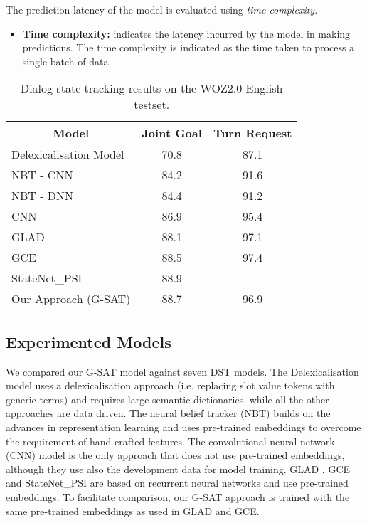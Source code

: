 \documentclass{article}
\begin{document}
The prediction latency of the model is evaluated using \textit{time complexity}.
\begin{itemize}
    \item \textbf{Time complexity:} indicates the latency incurred by the model in making predictions. The time complexity is indicated as the time taken to process a single batch of data.
\end{itemize}

\begin{table}
    \centering
    \begin{tabular}{l|c|c}
        \multicolumn{1}{c|}{\textbf{Model}} & \textbf{Joint Goal} & \textbf{Turn Request}\\
        \hline
        Delexicalisation Model\cite{NBT} & 70.8 & 87.1\\
NBT - CNN\cite{NBT} & 84.2 & 91.6 \\
        NBT - DNN\cite{NBT} & 84.4 & 91.2 \\    
        CNN\cite{Mandy2018} & 86.9 & 95.4\\
        GLAD\cite{GLAD} & 88.1 & 97.1\\
        GCE\cite{GCE} & 88.5 & 97.4\\
        StateNet\_PSI\cite{Ren2018} & 88.9 & - \\
        \hline
        Our Approach (G-SAT) & 88.7 & 96.9 \\
\end{tabular}
    \label{tab:exp_results}
    \caption{Dialog state tracking results on the WOZ2.0 English testset.}
\end{table}

\subsection{Experimented Models}
We compared our G-SAT model against seven DST models. The Delexicalisation model \cite{NBT} uses a delexicalisation approach (i.e. replacing slot value tokens with generic terms) and requires large semantic dictionaries, while all the other approaches are data driven.
The neural belief tracker (NBT) \cite{NBT} builds on the advances in representation learning and uses pre-trained embeddings to overcome the requirement of hand-crafted features. 
The convolutional neural network (CNN) model \cite{Mandy2018} is the only approach that does not use pre-trained embeddings, although they use also the development data for model training.
GLAD \cite{GLAD}, GCE \cite{GCE} and StateNet\_PSI \cite{Ren2018} are based on recurrent neural networks
and use pre-trained embeddings.
To facilitate comparison, our G-SAT approach is trained with the same pre-trained embeddings as used in GLAD and GCE.
\end{document}
